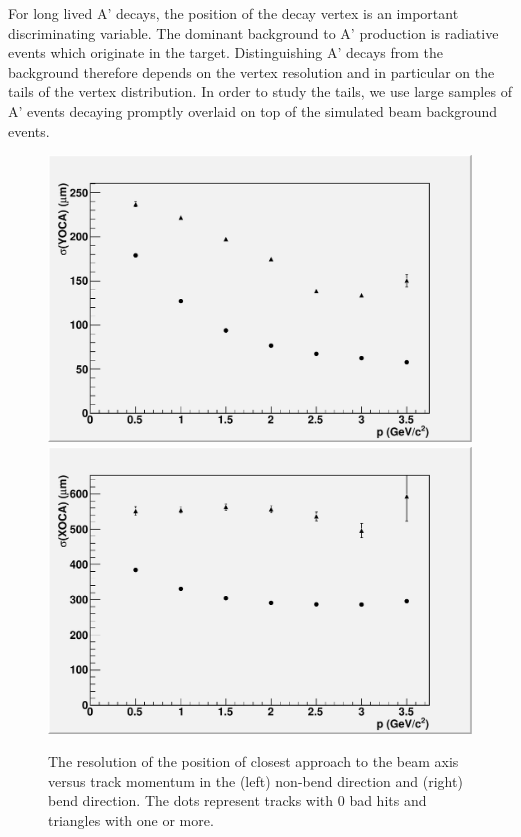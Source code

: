 For long lived A' decays, the position of the decay vertex is an important discriminating 
variable.  The dominant background to A' production is radiative events which originate 
in the target. Distinguishing A' decays from the background therefore depends on the vertex 
resolution and in particular on the tails of the vertex distribution. In order to study 
the tails, we use large samples of A' events decaying promptly overlaid on top of the 
simulated beam background events.
   
\begin{figure}
\includegraphics[scale=0.4]{performance/tracking_performance/yoca-MomResolution.pdf}
\includegraphics[scale=0.4]{performance/tracking_performance/xoca-MomResolution.pdf}
\caption{The resolution of the position of closest approach to the beam axis 
versus track momentum in the (left) non-bend direction and (right) bend direction.  
The dots represent tracks with 0 bad hits and triangles with one or more. }
 \label{fig:doca}
\end{figure}

